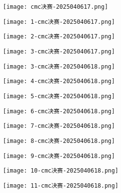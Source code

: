 \begin{figure}[H]
\centering
\texttt{[image: cmc决赛-2025040617.png]}
\label{}
\end{figure}
\begin{figure}[H]
\centering
\texttt{[image: 1-cmc决赛-2025040617.png]}
\label{}
\end{figure}
\begin{figure}[H]
\centering
\texttt{[image: 2-cmc决赛-2025040617.png]}
\label{}
\end{figure}
\begin{figure}[H]
\centering
\texttt{[image: 3-cmc决赛-2025040617.png]}
\label{}
\end{figure}
\begin{figure}[H]
\centering
\texttt{[image: 3-cmc决赛-2025040618.png]}
\label{}
\end{figure}
\begin{figure}[H]
\centering
\texttt{[image: 4-cmc决赛-2025040618.png]}
\label{}
\end{figure}
\begin{figure}[H]
\centering
\texttt{[image: 5-cmc决赛-2025040618.png]}
\label{}
\end{figure}
\begin{figure}[H]
\centering
\texttt{[image: 6-cmc决赛-2025040618.png]}
\label{}
\end{figure}
\begin{figure}[H]
\centering
\texttt{[image: 7-cmc决赛-2025040618.png]}
\label{}
\end{figure}
\begin{figure}[H]
\centering
\texttt{[image: 8-cmc决赛-2025040618.png]}
\label{}
\end{figure}
\begin{figure}[H]
\centering
\texttt{[image: 9-cmc决赛-2025040618.png]}
\label{}
\end{figure}
\begin{figure}[H]
\centering
\texttt{[image: 10-cmc决赛-2025040618.png]}
\label{}
\end{figure}
\begin{figure}[H]
\centering
\texttt{[image: 11-cmc决赛-2025040618.png]}
\label{}
\end{figure}
